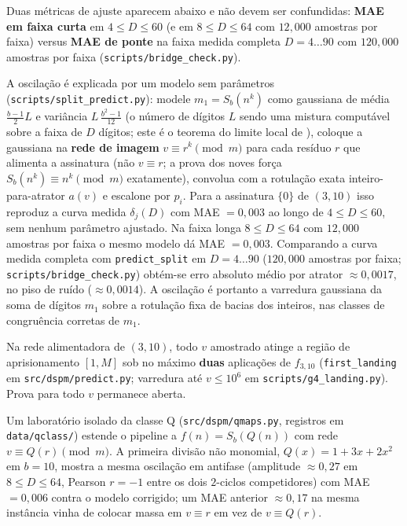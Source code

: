 \documentclass[11pt]{article}
\theoremstyle{definition}
\theoremstyle{remark}
\begin{document}
Duas métricas de ajuste aparecem abaixo e não devem ser confundidas: \textbf{MAE em faixa curta} em $4 \le D \le 60$ (e em $8 \le D \le 64$ com $12{,}000$ amostras por faixa) versus \textbf{MAE de ponte} na faixa medida completa $D=4\ldots 90$ com $120{,}000$ amostras por faixa (\texttt{scripts/bridge\_check.py}).

A oscilação é explicada por um modelo sem parâmetros (\texttt{scripts/split\_predict.py}): modele $m_1 = S_b(n^k)$ como gaussiana de média $\tfrac{b-1}{2}L$ e variância $L\,\tfrac{b^2-1}{12}$ (o número de dígitos $L$ sendo uma mistura computável sobre a faixa de $D$ dígitos; este é o teorema do limite local de \cite{mauduit-rivat,dmr}), coloque a gaussiana na \textbf{rede de imagem} $v \equiv r^k \pmod m$ para cada resíduo $r$ que alimenta a assinatura (não $v \equiv r$; a prova dos noves força $S_b(n^k) \equiv n^k \pmod m$ exatamente), convolua com a rotulação exata inteiro-para-atrator $a(v)$ e escalone por $p_i$. Para a assinatura $\{0\}$ de $(3,10)$ isso reproduz a curva medida $\delta_j(D)$ com MAE $= 0{,}003$ ao longo de $4 \le D \le 60$, sem nenhum parâmetro ajustado. Na faixa longa $8 \le D \le 64$ com $12{,}000$ amostras por faixa o mesmo modelo dá MAE $= 0{,}003$. Comparando a curva medida completa com \texttt{predict\_split} em $D=4\ldots 90$ ($120{,}000$ amostras por faixa; \texttt{scripts/bridge\_check.py}) obtém-se erro absoluto médio por atrator \textbf{$\approx 0{,}0017$}, no piso de ruído ($\approx 0{,}0014$). A oscilação é portanto a varredura gaussiana da soma de dígitos $m_1$ sobre a rotulação fixa de bacias dos inteiros, nas classes de congruência corretas de $m_1$.

Na rede alimentadora de $(3,10)$, todo $v$ amostrado atinge a região de aprisionamento $[1,M]$ sob no máximo \textbf{duas} aplicações de $f_{3,10}$ (\texttt{first\_landing} em \texttt{src/dspm/predict.py}; varredura até $v \le 10^6$ em \texttt{scripts/g4\_landing.py}). Prova para todo $v$ permanece aberta.

Um laboratório isolado da classe Q (\texttt{src/dspm/qmaps.py}, registros em \texttt{data/qclass/}) estende o pipeline a $f(n)=S_b(Q(n))$ com rede $v \equiv Q(r) \pmod m$. A primeira divisão não monomial, $Q(x)=1+3x+2x^2$ em $b=10$, mostra a mesma oscilação em antifase (amplitude $\approx 0{,}27$ em $8 \le D \le 64$, Pearson $r=-1$ entre os dois $2$-ciclos competidores) com MAE $= 0{,}006$ contra o modelo corrigido; um MAE anterior $\approx 0{,}17$ na mesma instância vinha de colocar massa em $v \equiv r$ em vez de $v \equiv Q(r)$.
\end{document}
